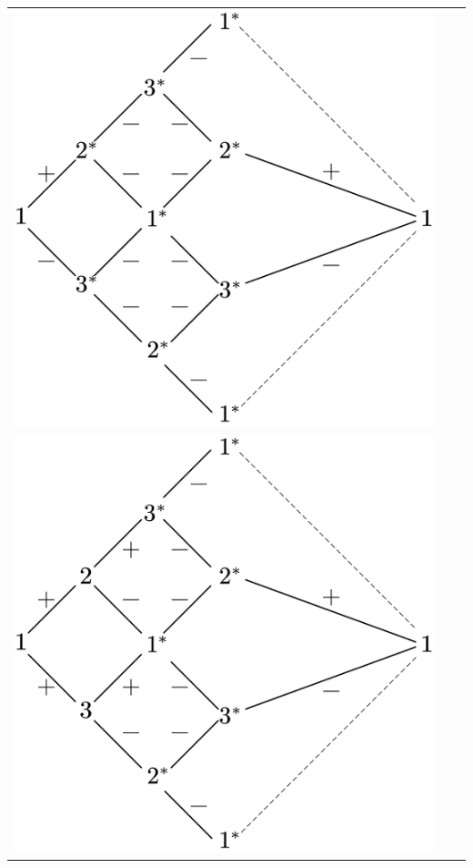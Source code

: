 \documentclass[a4paper]{book}
\newcounter{solution}[chapter]
\begin{document}
\begin{solution}
\begin{itemize}
\begin{center}
\begin{tabular}{ccc}
		\begin{minipage}{0.3\linewidth}
		\centering
		\includegraphics[scale=0.5,trim=0 -8 0 -8]{./pictures/6.07/pictorial_representation_3.png}
		\end{minipage} \\
		
		\begin{minipage}{0.3\linewidth}
		\centering
		\includegraphics[scale=0.5,trim=0 -8 0 -8]{./pictures/6.07/pictorial_representation_4.png}
		\end{minipage} &
			

\end{tabular}
\end{center}
\end{itemize}
\end{solution}
\end{document}
